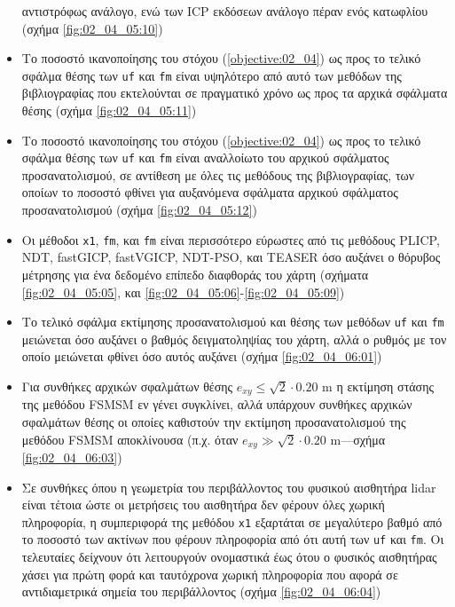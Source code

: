 \begin{itemize}
        αντιστρόφως ανάλογο, ενώ των ICP εκδόσεων ανάλογο πέραν ενός κατωφλίου
        (σχήμα \ref{fig:02_04_05:10})
  \item Το ποσοστό ικανοποίησης του στόχου (\ref{objective:02_04}) ως προς το
        τελικό σφάλμα θέσης των \texttt{uf} και \texttt{fm} είναι υψηλότερο
        από αυτό των μεθόδων της βιβλιογραφίας που εκτελούνται σε πραγματικό
        χρόνο ως προς τα αρχικά σφάλματα θέσης (σχήμα \ref{fig:02_04_05:11})
  \item Το ποσοστό ικανοποίησης του στόχου (\ref{objective:02_04}) ως προς
        το τελικό σφάλμα θέσης των \texttt{uf} και \texttt{fm} είναι αναλλοίωτο
        του αρχικού σφάλματος προσανατολισμού, σε αντίθεση με όλες τις μεθόδους
        της βιβλιογραφίας, των οποίων το ποσοστό φθίνει για αυξανόμενα σφάλματα
        αρχικού σφάλματος προσανατολισμού (σχήμα \ref{fig:02_04_05:12})
  \item Οι μέθοδοι \texttt{x1}, \texttt{fm}, και \texttt{fm} είναι περισσότερο
        εύρωστες από τις μεθόδους PLICP, NDT, fastGICP, fastVGICP, NDT-PSO, και
        TEASER όσο αυξάνει ο θόρυβος μέτρησης για ένα δεδομένο επίπεδο
        διαφθοράς του χάρτη (σχήματα \ref{fig:02_04_05:05}, και
        \ref{fig:02_04_05:06}-\ref{fig:02_04_05:09})
  \item Το τελικό σφάλμα εκτίμησης προσανατολισμού και θέσης των μεθόδων
        \texttt{uf} και \texttt{fm} μειώνεται όσο αυξάνει ο βαθμός
        δειγματοληψίας του χάρτη, αλλά ο ρυθμός με τον οποίο μειώνεται φθίνει
        όσο αυτός αυξάνει (σχήμα \ref{fig:02_04_06:01})
  \item Για συνθήκες αρχικών σφαλμάτων θέσης $e_{xy} \leq \sqrt{2}\cdot 0.20$ m
        η εκτίμηση στάσης της μεθόδου FSMSM εν γένει συγκλίνει, αλλά υπάρχουν
        συνθήκες αρχικών σφαλμάτων θέσης οι οποίες καθιστούν την εκτίμηση
        προσανατολισμού της μεθόδου FSMSM αποκλίνουσα (π.χ.  όταν $e_{xy} \gg
        \sqrt{2}\cdot 0.20$ m---σχήμα \ref{fig:02_04_06:03})
  \item Σε συνθήκες όπου η γεωμετρία του περιβάλλοντος του φυσικού αισθητήρα
        lidar είναι τέτοια ώστε οι μετρήσεις του αισθητήρα δεν φέρουν όλες
        χωρική πληροφορία, η συμπεριφορά της μεθόδου \texttt{x1} εξαρτάται
        σε μεγαλύτερο βαθμό από το ποσοστό των ακτίνων που φέρουν πληροφορία
        από ότι αυτή των \texttt{uf} και \texttt{fm}. Οι τελευταίες δείχνουν
        ότι λειτουργούν ονομαστικά έως ότου ο φυσικός αισθητήρας χάσει για
        πρώτη φορά και ταυτόχρονα χωρική πληροφορία που αφορά σε αντιδιαμετρικά
        σημεία του περιβάλλοντος (σχήμα \ref{fig:02_04_06:04})

\end{itemize}
